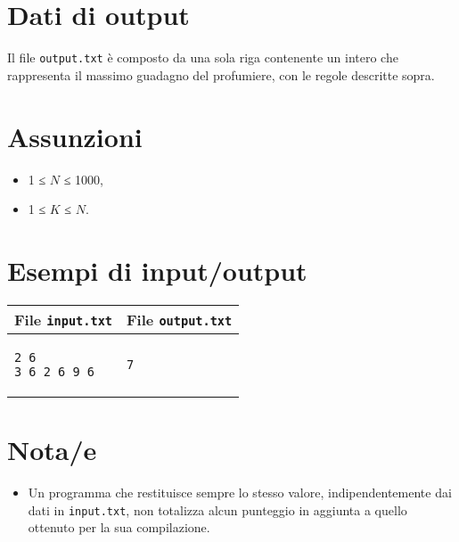 \documentclass[a4paper,11pt]{article}
\begin{document}
\section*{Dati di output}
  
Il file \texttt{output.txt} è composto da una sola riga
contenente un intero che rappresenta il massimo guadagno del profumiere,
con le regole descritte sopra.

  \section*{Assunzioni}
  \begin{itemize}
  
    \item  1 ≤ $N $ ≤ 1000,
    \item  1 ≤ $K $ ≤ $N $.
  \end{itemize}

\section*{Esempi di input/output}

  
    \noindent
    \begin{tabular}{p{11cm}|p{5cm}}
    \toprule
    \textbf{File \texttt{input.txt}}
    & \textbf{File \texttt{output.txt}}
    \\
    \midrule
    \scriptsize
    \begin{verbatim}
2 6
3 6 2 6 9 6
\end{verbatim}
    &
    \scriptsize
    \begin{verbatim}
7
\end{verbatim}
    \\
    \bottomrule
    \end{tabular}
  
\section*{Nota/e}
\begin{itemize}
  
    \item Un programma che restituisce sempre lo stesso valore,
indipendentemente dai dati in \texttt{input.txt}, non totalizza
alcun punteggio in aggiunta a quello ottenuto per la sua
compilazione.
\end{itemize}
\end{document}
